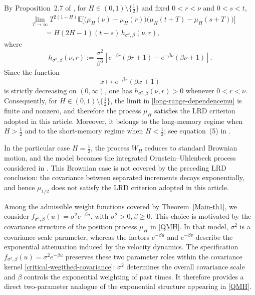 \documentclass[preprint,12pt,authoryear]{elsarticle}
\begin{document}
By Proposition~2.7 of \cite{RCMS24}, for
$H\in(0,1)\setminus\{\frac12\}$ and fixed
$0<r<\nu$ and $0<s<t$,
\begin{equation}\label{long-range-dependencemu}
\begin{aligned}
    &\lim_{T\to\infty}
    T^{2(1-H)}
    \mathbb{E}
    \Big[
        \bigl(\mu_H(\nu)-\mu_H(r)\bigr)
        \bigl(\mu_H(t+T)-\mu_H(s+T)\bigr)
    \Big]
    \\
    &\qquad
    =
    H(2H-1)(t-s)\,
    h_{\sigma^2,\beta}(\nu,r),
\end{aligned}
\end{equation}
where
\[
    h_{\sigma^2,\beta}(\nu,r)
    :=
    \frac{\sigma^2}{\beta^3}
    \left[
        e^{-\beta r}(\beta r+1)
        -
        e^{-\beta\nu}(\beta\nu+1)
    \right].
\]
Since the function
\[
    x\longmapsto e^{-\beta x}(\beta x+1)
\]
is strictly decreasing on $(0,\infty)$, one has
$h_{\sigma^2,\beta}(\nu,r)>0$ whenever $0<r<\nu$.
Consequently, for
$H\in(0,1)\setminus\{\frac12\}$, the limit in
\eqref{long-range-dependencemu} is finite and nonzero, and therefore
the process $\mu_H$ satisfies the LRD criterion adopted in this
article. Moreover, it belongs to the long-memory regime when
$H>\frac12$ and to the short-memory regime when $H<\frac12$; see
equation~(5) in \cite{Gorostiza2015}.

In the particular case $H=\frac12$, the process $W_H$ reduces to
standard Brownian motion, and the model becomes the integrated
Ornstein--Uhlenbeck process considered in \cite{John}. This Brownian
case is not covered by the preceding LRD conclusion: the covariance
between separated increments decays exponentially, and hence
$\mu_{1/2}$ does not satisfy the LRD criterion adopted in this
article.


Among the admissible weight functions covered by
Theorem~\ref{Main-th1}, we consider
\(f_{\sigma^2,\beta}(u)=\sigma^2e^{-\beta u}\), with
\(\sigma^2>0,\beta\ge0\). This choice is motivated by the covariance
structure of the position process \(\mu_H\) in \eqref{QMH}. In that
model, \(\sigma^2\) is a covariance scale parameter, whereas the factors
\(e^{-\beta u}\) and \(e^{-\beta v}\) describe the exponential
attenuation induced by the velocity dynamics. The specification
\(f_{\sigma^2,\beta}(u)=\sigma^2e^{-\beta u}\) preserves these two
parameter roles within the covariance kernel
\eqref{critical-wegithed-covariance}: \(\sigma^2\) determines the overall
covariance scale and \(\beta\) controls the exponential weighting of past
times. It therefore provides a direct two-parameter analogue of the
exponential structure appearing in \eqref{QMH}.
\end{document}
